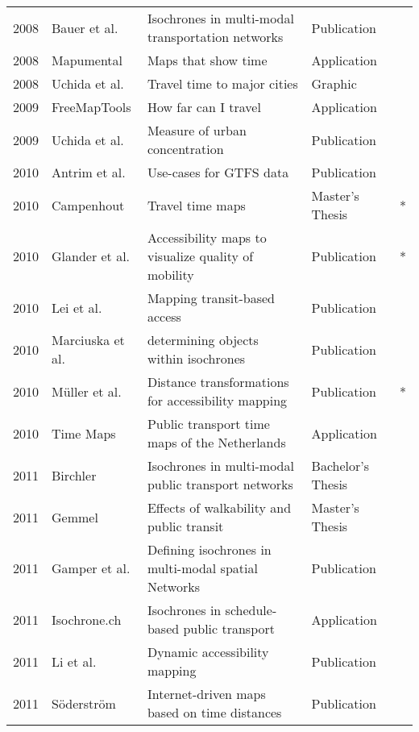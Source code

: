 \begin{table}[htb]
\begin{tabular}{r|l|l|l|c}
      2008 & Bauer et al. \cite{bauer2008computing} & Isochrones in multi-modal transportation networks  & Publication  & \\
      2008 & Mapumental \cite{Mapumental}  &  Maps that show time & Application  & \\
      2008 & Uchida et al. \cite{Uchida2008} & Travel time to major cities  & Graphic  & \\
      2009 & FreeMapTools \cite{Freemaptools} & How far can I travel  & Application  & \\
      2009 & Uchida et al. \cite{uchida2009agglomeration} & Measure of urban concentration  & Publication  & \\
      2010 & Antrim et al. \cite{antrim2013many} & Use-cases for GTFS data & Publication  & \\
      2010 & Campenhout \cite{van2010travel} & Travel time maps  & Master's Thesis  & * \\
      2010 & Glander et al. \cite{Glander2010} & Accessibility maps to visualize quality of mobility  &  Publication & * \\
      2010 & Lei et al. \cite{lei2010mapping} & Mapping transit-based access  & Publication  & \\
      2010 & Marciuska et al. \cite{marciuska2010determining} & determining objects within isochrones  & Publication  & \\
      2010 & Müller et al. \cite{Mueller2010} & Distance transformations for accessibility mapping  &  Publication & * \\
      2010 & Time Maps \cite{TimeMaps} & Public transport time maps of the Netherlands & Application  & \\
      2011 & Birchler \cite{birchler2011computing} & Isochrones in multi-modal public transport networks  & Bachelor's Thesis  & \\
      2011 & Gemmel \cite{gemmel2012hedonic} &  Effects of walkability and public transit & Master's Thesis  & \\
      2011 & Gamper et al. \cite{gamper2011defining} & Defining isochrones in multi-modal spatial Networks & Publication  & \\
      2011 & Isochrone.ch \cite{IsochroneCh}  & Isochrones in schedule-based public transport  & Application  & \\
      2011 & Li et al. \cite{li2011dynamic} & Dynamic accessibility mapping  & Publication  & \\
      2011 & Söderström \cite{soderstrom2011personal} & Internet-driven maps based on time distances  & Publication  & \\

\end{tabular}
\end{table}

